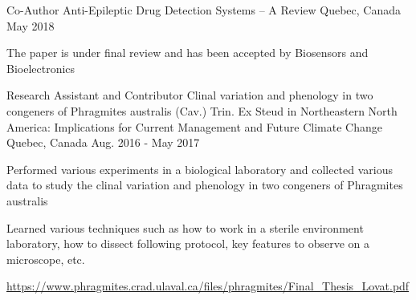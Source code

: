 \begin{cventries}
  \cventry
    {Co-Author}
    {Anti-Epileptic Drug Detection Systems – A Review}
    {Quebec, Canada}
    {May 2018}
    {
      \begin{cvitems}
        \item {The paper is under final review and has been accepted by Biosensors and Bioelectronics}
      \end{cvitems}
    }    \newline

        \cventry
    {Research Assistant
and Contributor}
    {Clinal variation and phenology in two congeners of Phragmites australis (Cav.) Trin. Ex Steud in Northeastern North America: Implications for Current Management and Future Climate Change}
    {Quebec, Canada}
    {Aug. 2016 - May 2017}
    {
      \begin{cvitems}
        \item {Performed various experiments in a biological laboratory and collected various data to study the clinal variation and phenology in two congeners of Phragmites australis}
        \item {Learned various techniques such as how to work in a sterile environment laboratory, how to dissect following protocol, key features to observe on a microscope, etc. }
        \item{\url{https://www.phragmites.crad.ulaval.ca/files/phragmites/Final_Thesis_Lovat.pdf}}
      \end{cvitems}
    }
 
\end{cventries}
